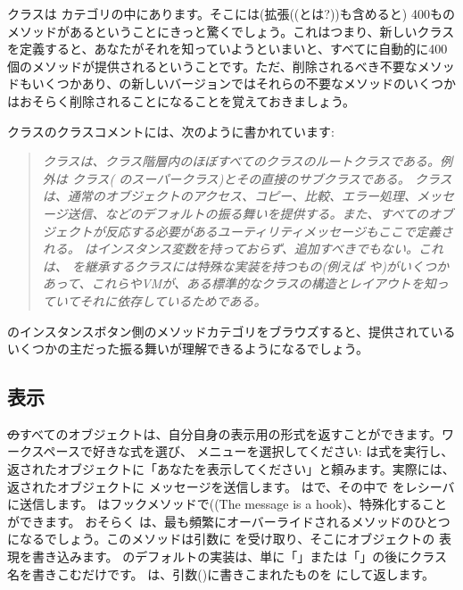 \documentclass[a4paper,10pt,twoside]{book}
\begin{document}
 クラスは カテゴリの中にあります。そこには(拡張((とは?))も含めると) 400ものメソッドがあるということにきっと驚くでしょう。これはつまり、新しいクラスを定義すると、あなたがそれを知っていようといまいと、すべてに自動的に400個のメソッドが提供されるということです。ただ、削除されるべき不要なメソッドもいくつかあり、\pharo の新しいバージョンではそれらの不要なメソッドのいくつかはおそらく削除されることになることを覚えておきましょう。

 クラスのクラスコメントには、次のように書かれています:

\begin{quote}
\textit{ クラスは、クラス階層内のほぼすべてのクラスのルートクラスである。例外は クラス( のスーパークラス)とその直接のサブクラスである。
 クラスは、通常のオブジェクトのアクセス、コピー、比較、エラー処理、メッセージ送信、などのデフォルトの振る舞いを提供する。また、すべてのオブジェクトが反応する必要があるユーティリティメッセージもここで定義される。
 はインスタンス変数を持っておらず、追加すべきでもない。これは、 を継承するクラスには特殊な実装を持つもの(例えば や)がいくつかあって、これらやVMが、ある標準的なクラスの構造とレイアウトを知っていてそれに依存しているためである。}
\end{quote}

 のインスタンスボタン側のメソッドカテゴリをブラウズすると、提供されているいくつかの主だった振る舞いが理解できるようになるでしょう。

\subsection{表示}
\st のすべてのオブジェクトは、自分自身の表示用の形式を返すことができます。ワークスペースで好きな式を選び、 メニューを選択してください:  は式を実行し、返されたオブジェクトに「あなたを表示してください」と頼みます。実際には、返されたオブジェクトに メッセージを送信します。 はで、その中で をレシーバに送信します。 はフックメソッドで((The message  is a hook)、特殊化することができます。
おそらく は、最も頻繁にオーバーライドされるメソッドのひとつになるでしょう。このメソッドは引数に を受け取り、そこにオブジェクトの 表現を書き込みます。 のデフォルトの実装は、単に「」または「」の後にクラス名を書きこむだけです。 は、引数()に書きこまれたものを にして返します。
\end{document}
